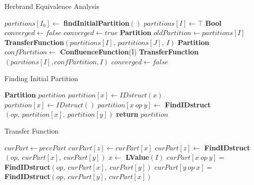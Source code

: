 \begin{algorithm}
\caption{Herbrand Equivalence Analysis}\label{HerbrandEquivalenceAnalysis}
\begin{algorithmic}[1]
    \State $partitions[I_0] \gets$ \textbf{findInitialPartition}$()$
    \State
        \State $partitions[I] \gets \top$
    \EndFor
    \State
    \State \textbf{Bool} $converged \gets false$
        \State $converged \gets true$
        \State
            \State \textbf{Partition} $oldPartition \gets partitions[I]$
            \State
                \State \textbf{TransferFunction}$(partitions[I],\ partitions[J],\ I)$
            \Else
                \State \textbf{Partition} $confPartition \gets$ \textbf{ConfluenceFunction}(I)
                \State \textbf{TransferFunction}$(paritions[I], confPartition, I)$
            \EndIf
            \State
                \State $converged \gets false$
            \EndIf
        \EndFor
    \EndWhile
\EndProcedure
\end{algorithmic}
\end{algorithm}

\begin{algorithm}
\caption{Finding Initial Partition}\label{FindInitialPartition}
\begin{algorithmic}[1]
    \State \textbf{Partition} $partition$
    \State
        \State $partition[x] \gets IDstruct(x)$
    \EndFor
        \State $partition[x] \gets IDstruct()$
    \EndFor
        \State $partition[x\ op\ y] \gets$ \textbf{FindIDstruct}$(op,\ partition[x],\ partition[y])$
    \EndFor
    \State
    \State \textbf{return} $partition$
\EndProcedure
\end{algorithmic}
\end{algorithm}
    
\begin{algorithm}
\caption{Transfer Function}\label{TransferFunction}
\begin{algorithmic}[1]
    \State
    \State $curPart \gets prevPart$
    \State
        \State $curPart[z] \gets curPart[x]$
        \State $curPart[z] \gets$ \textbf{FindIDstruct}$(op,\ curPart[x],\ curPart[y])$
    \EndIf
    \State
    \State $x \gets$ \textbf{LValue}$(I)$
            \State $curPart[x\ op\ y] = $ \textbf{FindIDstruct}$(op,\ curPart[x],\ curPart[y])$
            \State $curPart[y\ op\ x] = $ \textbf{FindIDstruct}$(op,\ curPart[y],\ curPart[x])$
        \EndFor
    \EndFor
\EndProcedure
\end{algorithmic}
\end{algorithm}

